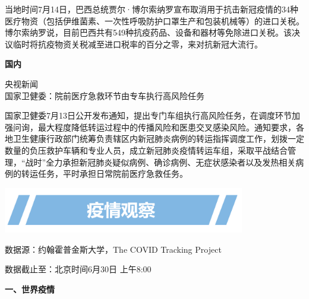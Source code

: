 \documentclass[]{article}
\begin{document}
当地时间7月14日，巴西总统贾尔·博尔索纳罗宣布取消用于抗击新冠疫情的34种医疗物资（包括伊维菌素、一次性呼吸防护口罩生产和包装机械等）的进口关税。博尔索纳罗说，目前巴西共有549种抗疫药品、设备和器材等免除进口关税。该决议临时将抗疫物资关税减至进口税率的百分之零，来对抗新冠大流行。

\vspace{5mm}

\begin{huge}{\textcolor{glaucous}{\textbf {国内}}}\end{huge}

\vspace{-3mm}

\begin{center}
\textcolor{glaucous}{央视新闻}\\国家卫健委：院前医疗急救环节由专车执行高风险任务
\end{center}

国家卫健委7月13日公开发布通知，提出专门车组执行高风险任务，在调度环节加强问询，最大程度降低转运过程中的传播风险和医患交叉感染风险。通知要求，各地卫生健康行政部门统筹负责辖区内新冠肺炎病例的转运指挥调度工作，划拨一定数量的负压救护车辆和专业人员，成立新冠肺炎疫情转运车组，采取平战结合管理，``战时''全力承担新冠肺炎疑似病例、确诊病例、无症状感染者以及发热相关病例的转运任务，平时承担日常院前医疗急救任务。

\vspace{10mm}

\begin{center}
\includegraphics[height=2cm]{./input/title2.png} 
\end{center}

\begin{Large}
\vspace{-7mm}
{数据源：约翰霍普金斯大学，The COVID Tracking  Project}
\end{Large}

\vspace{-7mm}

\begin{Large}
{数据截止至：北京时间6月30日 上午8:00}
\end{Large}

\begin{huge}{\textcolor{glaucous}{\textbf {一、世界疫情}}}\end{huge}
\end{document}
